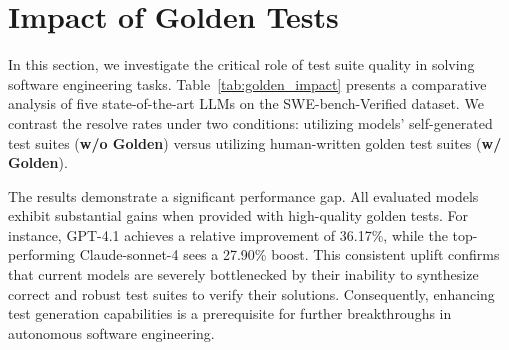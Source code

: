 \documentclass[11pt]{article}
\begin{document}
\section{Impact of Golden Tests}
\label{sec:Impact of Golden Tests}
\begin{table}[h!]
  \centering
  \caption{
    Comparison of SWE-bench Verified~\citep{openai2024swebench} resolve rates. The last column shows the relative improvement provided by human-written golden tests compared to self-generated tests.
  }
  \label{tab:golden_impact}
\end{table}
In this section, we investigate the critical role of test suite quality in solving software engineering tasks. Table~\ref{tab:golden_impact} presents a comparative analysis of five state-of-the-art LLMs on the SWE-bench-Verified dataset. We contrast the resolve rates under two conditions: utilizing models' self-generated test suites (\textbf{w/o Golden}) versus utilizing human-written golden test suites (\textbf{w/ Golden}).

The results demonstrate a significant performance gap. All evaluated models exhibit substantial gains when provided with high-quality golden tests. For instance, GPT-4.1 achieves a relative improvement of 36.17\%, while the top-performing Claude-sonnet-4 sees a 27.90\% boost. This consistent uplift confirms that current models are severely bottlenecked by their inability to synthesize correct and robust test suites to verify their solutions. Consequently, enhancing test generation capabilities is a prerequisite for further breakthroughs in autonomous software engineering.
\end{document}
